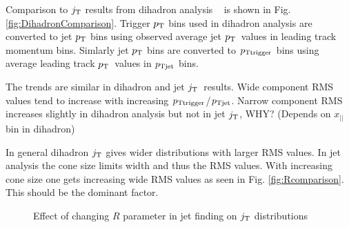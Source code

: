 Comparison to $\jt{}$ results from dihadron analysis ~\cite{ALICEjt} is shown in Fig. \ref{fig:DihadronComparison}. Trigger $p_{\rm T}$ bins used in dihadron analysis are converted to jet $p_{\rm T}$ bins using observed average jet $p_{\rm T}$ values in leading track momentum bins. Simlarly jet $p_{\rm T}$ bins are converted to $p_{\rm Ttrigger}$ bins using average leading track $p_{\rm T}$ values in $p_{\rm Tjet}$ bins.

The trends are similar in dihadron and jet $\jt{}$ results. Wide component RMS values tend to increase with increasing $p_{\rm Ttrigger}$/$p_{\rm Tjet}$. Narrow component RMS increases slightly in dihadron analysis but not in jet $\jt{}$, WHY? (Depends on $x_{||}$ bin in dihadron)

In general dihadron $\jt{}$ gives wider distributions with larger RMS values. In jet analysis the cone size limits width and thus the RMS values. With increasing cone size one gets increasing wide RMS values as seen in Fig. \ref{fig:Rcomparison}. This should be the dominant factor.

\begin{figure}[htp]
\centering
{}
\caption[\textsc{Pythia} $R$ parameters $\jt{}$]{Effect of changing $R$ parameter in jet finding on $\jt{}$ distributions}
\end{figure}


